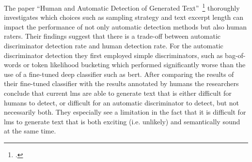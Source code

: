 The paper ``Human and Automatic Detection of Generated Text''~\footcite{ippolito2019human} thoroughly investigates which choices such as sampling strategy and text excerpt length can impact the performance of not only automatic detection methods but also human raters. Their findings suggest that there is a trade-off between automatic discriminator detection rate and human detection rate. For the automatic discriminator detection they first employed simple discriminators, such as bag-of-words or token likelihood bucketing which performed significantly worse than the use of a fine-tuned deep classifier such as \gls{bert}. After comparing the results of their fine-tuned classifier with the results annotated by humans the researchers conclude that current \gls{lm}s are able to generate text that is either difficult for humans to detect, or difficult for an automatic discriminator to detect, but not necessarily both. They especially see a limitation in the fact that it is difficult for \gls{lm}s to generate text that is both exciting (i.e. unlikely) and semantically sound at the same time.
